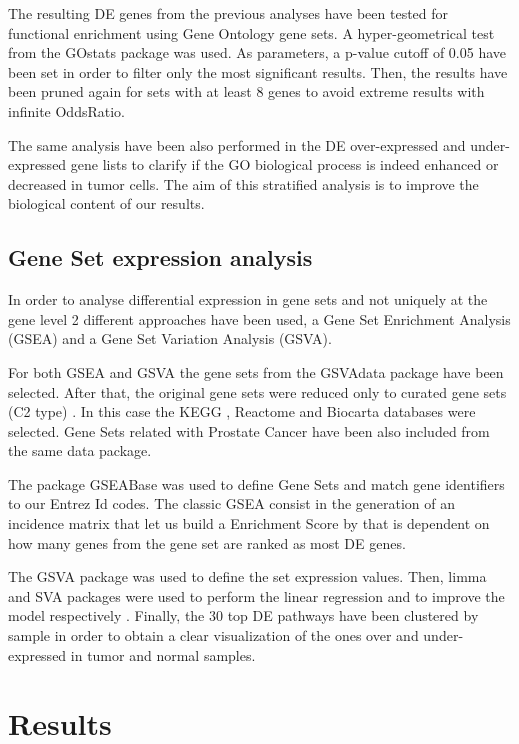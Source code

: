 \documentclass[9pt,twocolumn,twoside]{gsajnl}
\begin{document}
The resulting DE genes from the previous analyses have been tested for functional enrichment using Gene Ontology gene sets. A hyper-geometrical test from the GOstats package \cite{GOstats} was used. As parameters, a p-value cutoff of 0.05 have been set in order to filter only the most significant results. Then, the results have been pruned again for sets with at least 8 genes to avoid extreme results with infinite OddsRatio.

The same analysis have been also performed in the DE over-expressed and under-expressed gene lists to clarify if the GO biological process is indeed enhanced or decreased in tumor cells. The aim of this stratified analysis is to improve the biological content of our results.


\subsection*{Gene Set expression analysis}
In order to analyse differential expression in gene sets and not uniquely at the gene level 2 different approaches have been used, a Gene Set Enrichment Analysis (GSEA) and a Gene Set Variation Analysis (GSVA).

For both GSEA and GSVA the gene sets from the GSVAdata package \cite{GSVAdata} have been selected. After that, the original gene sets were reduced only to curated gene sets  (C2 type) . In this case the KEGG  \cite{kanehisa2016kegg}, Reactome \cite{fabregat2016reactome} and   Biocarta \cite{nishimura2001biocarta} databases were selected. Gene Sets related with Prostate Cancer have been also included from the same data package.


The package GSEABase \cite{GSEABase} was used to define Gene Sets and match gene identifiers to our Entrez Id codes. The classic GSEA consist in the generation of an incidence matrix that let us build a Enrichment Score by that is dependent on how many genes from the gene set are ranked as most DE genes.

The GSVA package \cite{GSVA} was used to define the set expression values. Then, limma  \cite{limma} and SVA packages were used to perform the linear regression and to improve the model respectively \cite{leek2007capturing,svamanual} . Finally, the 30 top DE pathways have been clustered by sample in order to obtain a clear visualization of the ones over and under-expressed in tumor and normal samples.


\section*{Results}
\end{document}
